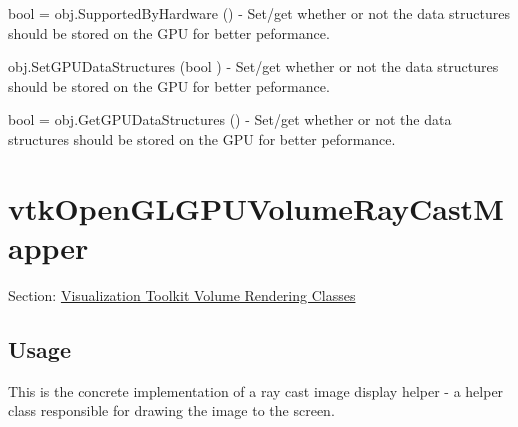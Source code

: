 \begin{DoxyItemize}
\item {\ttfamily bool = obj.\-Supported\-By\-Hardware ()} -\/ Set/get whether or not the data structures should be stored on the G\-P\-U for better peformance.  
\item {\ttfamily obj.\-Set\-G\-P\-U\-Data\-Structures (bool )} -\/ Set/get whether or not the data structures should be stored on the G\-P\-U for better peformance.  
\item {\ttfamily bool = obj.\-Get\-G\-P\-U\-Data\-Structures ()} -\/ Set/get whether or not the data structures should be stored on the G\-P\-U for better peformance.  
\end{DoxyItemize}\hypertarget{vtkvolumerendering_vtkopenglgpuvolumeraycastmapper}{}\section{vtk\-Open\-G\-L\-G\-P\-U\-Volume\-Ray\-Cast\-Mapper}\label{vtkvolumerendering_vtkopenglgpuvolumeraycastmapper}
Section\-: \hyperlink{sec_vtkvolumerendering}{Visualization Toolkit Volume Rendering Classes} \hypertarget{vtkwidgets_vtkxyplotwidget_Usage}{}\subsection{Usage}\label{vtkwidgets_vtkxyplotwidget_Usage}
This is the concrete implementation of a ray cast image display helper -\/ a helper class responsible for drawing the image to the screen.

